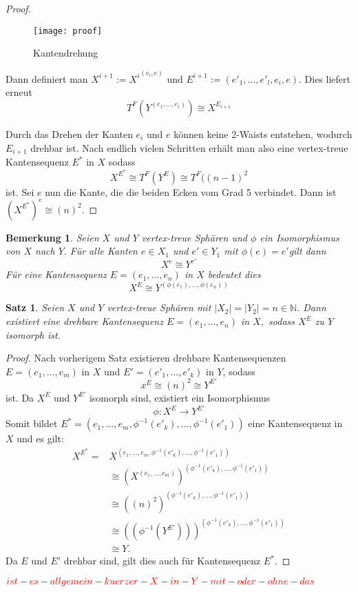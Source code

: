 \documentclass[12pt,titlepage,twoside,cleardoublepage]{article}
\theoremstyle{nummermitklammern}
\newtheorem{bemerkung}[temp]{Bemerkung}
\newtheorem{satz}[temp]{Satz}
\newtheorem{bemerkung}[zahl]{Bemerkung}
\newtheorem{satz}[zahl]{Satz}
\numberwithin{equation}{section}
\begin{document}
\begin{proof}
\begin{itemize}
\begin{figure}[H]
\begin{center}
\texttt{[image: proof]}
\end{center}
\caption{Kantendrehung}
\end{figure}
Dann definiert man $X^{i+1}:={X^i}^{(e_i,e)}$ und $E^{i+1}:=(e'_1,\ldots,e'_l,e_i,e).$ Dies liefert erneut
\[
T^F(Y^{(e_1,\ldots,e_i)})\cong X^{E_{i+1}}
\] 
\end{itemize}
 Durch das Drehen der Kanten $e_i$ und $e$ können keine 2-Waists entstehen, wodurch $E_{i+1}$ drehbar ist.
Nach endlich vielen Schritten erhält man also eine vertex-treue Kantensequenz $E^*$ in $X$ sodass 
\[X^{E^*}\cong T^F(Y^E) \cong T^F((n-1)^2
\]ist.
Sei $e$ nun die Kante, die die beiden Ecken vom Grad 5 verbindet. Dann ist $(X^{E^*})^e\cong (n)^2.$
\end{proof}
\begin{bemerkung}
Seien $X$ und $Y$ vertex-treue Sphären und $\phi$ ein Isomorphismus von $X$ nach $Y.$ Für alle Kanten $e\in X_1$ und $e'\in Y_1$ mit $\phi(e)=e'$gilt dann
\[ 
X^e \cong Y^{e'} 
\]
Für eine Kantensequenz $E=(e_1,\ldots,e_n)$ in $X$ bedeutet dies 
\[
X^E\cong Y^{(\phi(e_1),\ldots,\phi(e_n))}
\]
\end{bemerkung}
\begin{satz} \label{kantendrehung}
Seien $X$ und $Y$ vertex-treue Sphären mit $\vert X_2\vert=\vert Y_2\vert=n\in \mathbb{N}$.
Dann existiert eine drehbare Kantensequenz $E=(e_1,\ldots,e_n)$ in $X,$ sodass  $X^E$ zu $Y$ isomorph ist. 
\end{satz}
\begin{proof}
Nach vorherigem Satz existieren drehbare Kantensequenzen $E=(e_1,\ldots,e_m)$ in $X$ und $E'=(e'_1,\ldots,e'_{k})$ in $Y$, sodass 
\[
x^E\cong (n)^2 \cong Y^{E'}
\] ist.
Da $X^E$ und $Y^{E'}$ isomorph sind, existiert ein Isomorphismus 
\[
\phi: X^E\to Y^{E'}
\]
Somit bildet $E^*=(e_1,\ldots,e_m,\phi^{-1}(e'_{k}),\ldots,\phi^{-1}(e'_{1}))$ eine Kantensequenz in $X$ und es gilt:
\begin{align*}
X^{E^{*}} = &X^{(e_1,\ldots,e_m,\phi^{-1}(e'_{k}),\ldots,\phi^{-1}(e'_{1}))}\\
&\cong (X^{(e_1,\ldots,e_m)})^{(\phi^{-1}(e'_{k}),\ldots,\phi^{-1}(e'_{1}))}\\
&\cong ((n)^2)^{(\phi^{-1}(e'_{k}),\ldots,\phi^{-1}(e'_{1}))}\\
&\cong ((\phi^{-1}(Y^{E'})))^{(\phi^{-1}(e'_{k}),\ldots,\phi^{-1}(e'_{1}))}\\
&\cong Y .
\end{align*}
Da $E$ und $E'$ drehbar sind, gilt dies auch für Kantensequenz $E^*.$
\end{proof}
$\textcolor{red}{ist-es-allgemein-kuerzer-X-in-Y-mit-oder-ohne-das}$
\end{document}
